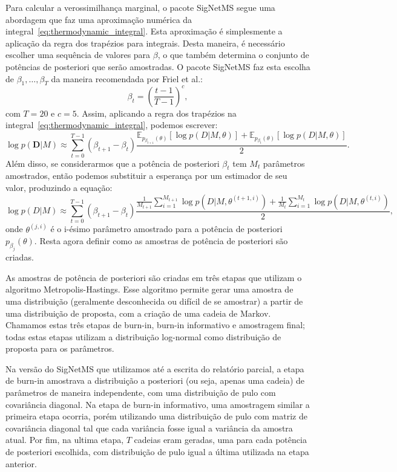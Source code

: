 \documentclass[12pt]{article}
\newcommand{\expectation}{\mathbb{E}}
\begin{document}
Para calcular a verossimilhança marginal, o pacote SigNetMS segue uma 
abordagem que faz uma aproximação numérica da 
integral~\ref{eq:thermodynamic_integral}. Esta aproximação é 
simplesmente a aplicação da regra dos trapézios para integrais. Desta 
maneira, é necessário escolher uma sequência de valores para $\beta$, 
o que também determina o conjunto de potências de posteriori que serão 
amostradas. O pacote SigNetMS faz esta escolha de $\beta_1, \ldots, 
\beta_T$ da maneira recomendada por Friel et al.:
\begin{equation*}
    \beta_t = \left(\frac{t - 1}{T - 1}\right)^{c}, 
\end{equation*}
com $T = 20$ e $c = 5$. Assim, aplicando a regra dos trapézios na
integral~\ref{eq:thermodynamic_integral}, podemos escrever:
\begin{equation*}
    \log{p(\mathbf{D}| M)} \approx \sum_{t = 0}^{T - 1} 
        (\beta_{t + 1} - \beta_t)
    \frac{
    \expectation_{p_{\beta_{t + 1}} (\theta)}[\log p(D | M, \theta)]
+ 
    \expectation_{p_{\beta_{t}} (\theta)}[\log p(D | M, \theta)]}
{2}.
\end{equation*}
Além disso, se considerarmos que a potência de posteriori $\beta_t$ tem
$M_t$ parâmetros amostrados, então podemos substituir a esperança por
um estimador de seu valor, produzindo a equação:
\begin{equation}
\log{p(D| M)} \approx \sum_{t = 0}^{T - 1} (\beta_{t + 1} - \beta_t)
\frac{
    \frac{1}{M_{t + 1}}
    \sum_{i = 1}^{M_{t + 1}}  \log p(D | M, \theta^{(t + 1, i)})
+ 
    \frac{1}{M_t}
    \sum_{i = 1}^{M_t}  \log p(D | M, \theta^{(t, i)})}
{2},
\end{equation}
onde $\theta^{(j, i)}$ é o i-ésimo parâmetro amostrado para a
potência de posteriori $p_{\beta_j}(\theta)$. Resta agora definir como
as amostras de potência de posteriori são criadas.

As amostras de potência de posteriori são criadas em três etapas que
utilizam o algoritmo Metropolis-Hastings. Esse algoritmo permite gerar
uma amostra de uma distribuição (geralmente desconhecida ou difícil de
se amostrar) a partir de uma distribuição de proposta, com a criação de
uma cadeia de Markov. Chamamos estas três etapas de burn-in, burn-in
informativo e amostragem final; todas estas etapas utilizam a
distribuição log-normal como distribuição de proposta para os 
parâmetros. 

Na versão do SigNetMS que utilizamos até a escrita do relatório parcial,
a etapa de burn-in amostrava a distribuição a posteriori (ou seja,
apenas uma cadeia) de parâmetros de maneira independente, com uma
distribuição de pulo com covariância diagonal. Na etapa de burn-in
informativo, uma amostragem similar a primeira etapa ocorria, porém
utilizando uma distribuição de pulo com matriz de covariância diagonal
tal que cada variância fosse igual a variância da amostra atual. Por
fim, na ultima etapa, $T$ cadeias eram geradas, uma para cada potência
de posteriori escolhida, com distribuição de pulo igual a última
utilizada na etapa anterior.
\end{document}

